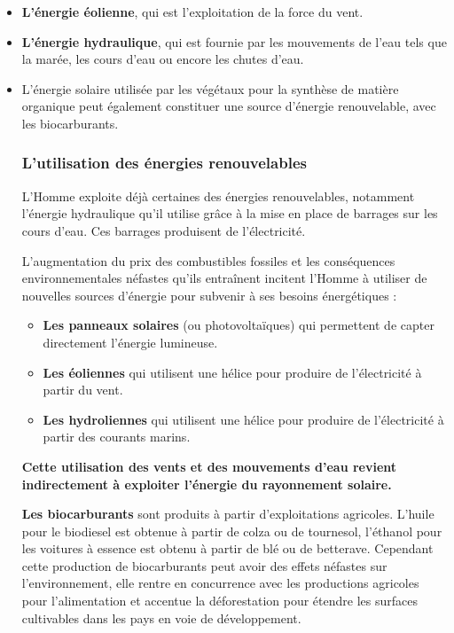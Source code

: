 \begin{itemize}
\item
  \textbf{L'énergie éolienne}, qui est l'exploitation de la force du
  vent.
\item
  \textbf{L'énergie hydraulique}, qui est fournie par les mouvements de
  l'eau tels que la marée, les cours d'eau ou encore les chutes d'eau.
\item
  L'énergie solaire utilisée par les végétaux pour la synthèse de
  matière organique peut également constituer une source d'énergie
  renouvelable, avec les biocarburants.


    \subsubsection{L'utilisation des énergies
    renouvelables}\label{lutilisation-des-uxe9nergies-renouvelables}


L'Homme exploite déjà certaines des énergies renouvelables, notamment
l'énergie hydraulique qu'il utilise grâce à la mise en place de barrages
sur les cours d'eau. Ces barrages produisent de l'électricité.

L'augmentation du prix des combustibles fossiles et les conséquences
environnementales néfastes qu'ils entraînent incitent l'Homme à utiliser
de nouvelles sources d'énergie pour subvenir à ses besoins énergétiques
:

\begin{itemize}
\item
  \textbf{Les panneaux solaires} (ou photovoltaïques) qui permettent de
  capter directement l'énergie lumineuse.
\item
  \textbf{Les éoliennes} qui utilisent une hélice pour produire de
  l'électricité à partir du vent.
\item
  \textbf{Les hydroliennes} qui utilisent une hélice pour produire de
  l'électricité à partir des courants marins.
\end{itemize}

\textbf{Cette utilisation des vents et des mouvements d'eau revient
indirectement à exploiter l'énergie du rayonnement solaire.}

\textbf{Les biocarburants} sont produits à partir d'exploitations
agricoles. L'huile pour le biodiesel est obtenue à partir de colza ou de
tournesol, l'éthanol pour les voitures à essence est obtenu à partir de
blé ou de betterave. Cependant cette production de biocarburants peut
avoir des effets néfastes sur l'environnement, elle rentre en
concurrence avec les productions agricoles pour l'alimentation et
accentue la déforestation pour étendre les surfaces cultivables dans les
pays en voie de développement.


\end{itemize}
